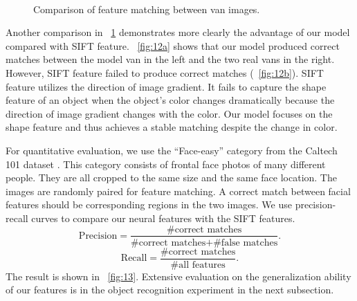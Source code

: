 \documentclass[twocolumn]{article}
\begin{document}
\begin{figure}[!t]
\centering
  \\
\caption{Comparison of feature matching between van images.}
\label{fig:12}
\end{figure}

Another comparison in \figurename~\ref{fig:12} demonstrates
more clearly the advantage of our model compared with SIFT feature.
\figurename~\ref{fig:12a} shows that our model produced correct matches
between the model van in the left and the two real vans in the right. 
However, SIFT feature failed to produce correct matches (\figurename~\ref{fig:12b}). 
SIFT feature utilizes the direction of image gradient. 
It fails to capture the shape feature of an object when the object's color changes dramatically because the direction of image gradient changes with the color. 
Our model focuses on the shape feature and thus achieves a stable matching despite the change in color.

For quantitative evaluation, we use the ``Face-easy'' category from the Caltech 101 dataset \cite{fei2007}.
This category consists of frontal face photos of many different people.
They are all cropped to the same size and the same face location.
The images are randomly paired for feature matching.
A correct match between facial features should be corresponding regions in the two images.
We use precision-recall curves to compare our neural features with the SIFT features.
\begin{equation}
\text{Precision} = \frac{\text{\#correct matches}}{\text{\#correct matches} + \text{\#false matches}}.
\end{equation}
\begin{equation}
\text{Recall} = \frac{\text{\#correct matches}}{\text{\#all features}}.
\end{equation}
The result is shown in \figurename~\ref{fig:13}.
Extensive evaluation on the generalization ability of our features is in the object recognition experiment in the next subsection.
\end{document}
